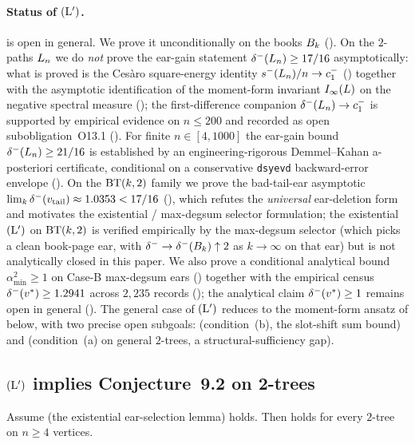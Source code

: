 \paragraph{Status of $(\mathrm{L}')$.}
 is open in general. We prove it unconditionally on
the books $B_{k}$ (). On the $2$-paths $L_{n}$ we
do \emph{not} prove the ear-gain statement
$\delta^{-}(L_{n}) \ge 17/16$ asymptotically: what is proved is the
Ces\`aro square-energy identity $s^{-}(L_{n})/n \to c_{1}^{-}$
() together with the asymptotic identification
of the moment-form invariant $I_{\infty}(L)$ on the negative spectral
measure (); the first-difference
companion $\delta^{-}(L_{n}) \to c_{1}^{-}$ is supported by empirical
evidence on $n \le 200$ and recorded as open subobligation~O13.1
(). For finite $n \in [4, 1000]$ the
ear-gain bound $\delta^{-}(L_{n}) \ge 21/16$ is established by an
engineering-rigorous Demmel--Kahan a-posteriori certificate,
conditional on a conservative \texttt{dsyevd} backward-error envelope
(). On the $\mathrm{BT}(k,2)$ family
we prove the bad-tail-ear asymptotic
$\lim_{k} \delta^{-}(v_{\mathrm{tail}}) \approx 1.0353 < 17/16$
(), which refutes the
\emph{universal} ear-deletion form and motivates the
existential / max-degsum selector formulation; the existential
$(\mathrm{L}')$ on $\mathrm{BT}(k,2)$ is verified empirically by the max-degsum
selector (which picks a clean book-page ear, with
$\delta^{-} \to \delta^{-}(B_{k}) \uparrow 2$ as $k \to \infty$ on that ear)
but is not analytically closed in this paper.
We also prove a conditional analytical bound
$\alpha_{\min}^{2} \ge 1$ on Case-B max-degsum ears
() together with the empirical census
$\delta^{-}(v^{*}) \ge 1.2941$ across $2{,}235$ records
(); the analytical claim $\delta^{-}(v^{*}) \ge 1$
remains open in general (). The general case of
$(\mathrm{L}')$ reduces to the moment-form ansatz of
 below, with two precise open subgoals:
 (condition~(b), the slot-shift sum bound) and
 (condition~(a) on general $2$-trees, a
structural-sufficiency gap).

\subsection{$(\mathrm{L}')$ implies Conjecture~9.2 on 2-trees}\label{sec:lprime:telescope}

\begin{proposition}\label{prop:Lprime-implies-92}
Assume  (the existential ear-selection lemma) holds.
Then  holds for every $2$-tree on $n \ge 4$ vertices.
\end{proposition}


